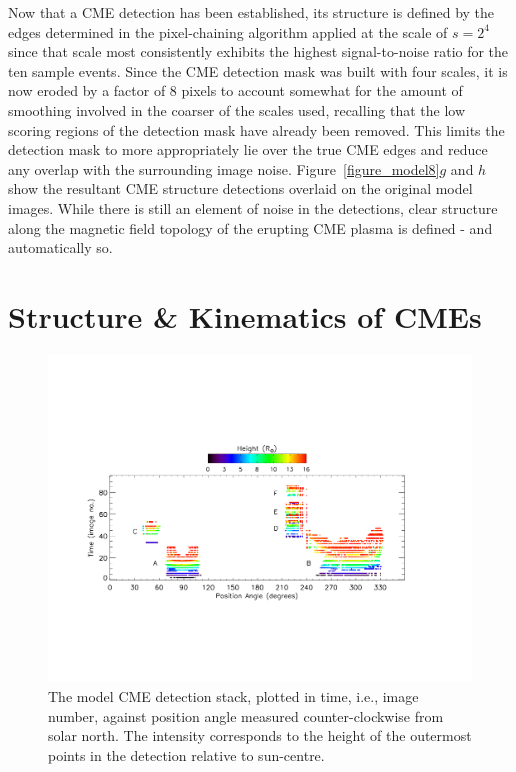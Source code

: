 \documentclass[namedreferences]{SolarPhysics}
\begin{document}
\begin{article}
Now that a CME detection has been established, its structure is defined by the edges determined in the pixel-chaining algorithm applied at the scale of $s=2^{4}$ since that scale most consistently exhibits the highest signal-to-noise ratio for the ten sample events. Since the CME detection mask was built with four scales, it is now eroded by a factor of 8 pixels to account somewhat for the amount of smoothing involved in the coarser of the scales used, recalling that the low scoring regions of the detection mask have already been removed. This limits the detection mask to more appropriately lie over the true CME edges and reduce any overlap with the surrounding image noise. Figure~\ref{figure_model8}$g$ and $h$ show the resultant CME structure detections overlaid on the original model images. While there is still an element of noise in the detections, clear structure along the magnetic field topology of the erupting CME plasma is defined - and automatically so.


\section{Structure \& Kinematics of CMEs}

\begin{figure}[!t]
\centerline{\includegraphics[scale=0.6, clip=true, trim=0 190 50 150]{images/figure_model_stack.pdf}}
\caption{The model CME detection stack, plotted in time, i.e., image number, against position angle measured counter-clockwise from solar north. The intensity corresponds to the height of the outermost points in the detection relative to sun-centre.}
\label{figure_model_stack}
\end{figure}


\end{article}
\end{document}
